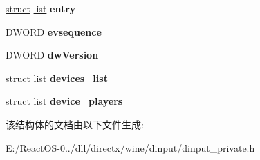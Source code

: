 \begin{DoxyCompactItemize}
\item 
\mbox{\label{struct_i_direct_input_impl_a5617c3a1079311eb7482f5f16a723852}} 
\hyperlink{interfacestruct}{struct} \hyperlink{classlist}{list} {\bfseries entry}
\item 
\mbox{\label{struct_i_direct_input_impl_ae177cedc5147f6eb451ed002cca5b248}} 
D\+W\+O\+RD {\bfseries evsequence}
\item 
\mbox{\label{struct_i_direct_input_impl_af9eb85435084537e31fb4d47fa80abf1}} 
D\+W\+O\+RD {\bfseries dw\+Version}
\item 
\mbox{\label{struct_i_direct_input_impl_a50762f1b49d7e72392cc331376c465cd}} 
\hyperlink{interfacestruct}{struct} \hyperlink{classlist}{list} {\bfseries devices\+\_\+list}
\item 
\mbox{\label{struct_i_direct_input_impl_a04620c338b1c5014950bc78ad7ceb6d1}} 
\hyperlink{interfacestruct}{struct} \hyperlink{classlist}{list} {\bfseries device\+\_\+players}
\end{DoxyCompactItemize}


该结构体的文档由以下文件生成\+:\begin{DoxyCompactItemize}
\item 
E\+:/\+React\+O\+S-\/0../dll/directx/wine/dinput/dinput\+\_\+private.\+h\end{DoxyCompactItemize}
